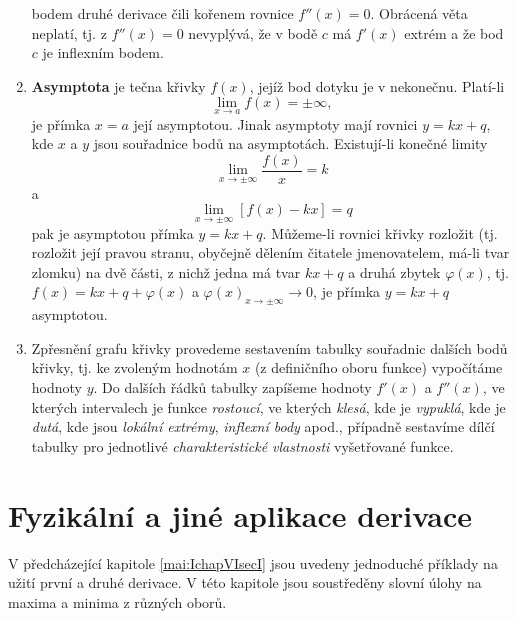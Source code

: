 \begin{enumerate}[noitemsep]
        bodem druhé derivace čili kořenem rovnice $f''(x)=0$. Obrácená věta neplatí, tj. z
        $f''(x)=0$ nevyplývá, že v bodě $c$ má $f'(x)$ extrém a že bod $c$ je inflexním bodem.
      \item \textbf{Asymptota} je tečna křivky $f(x)$, jejíž bod dotyku je v nekonečnu. Platí-li  
        $$\lim_{x \to a}f(x) =  \pm\infty,$$ je přímka $x=a$ její asymptotou. Jinak asymptoty mají
        rovnici $y=kx+q$, kde $x$ a $y$ jsou souřadnice bodů na asymptotách. Existují-li konečné
        limity $$\lim_{x \to \pm\infty}\frac{f(x)}{x}=k$$  a $$\lim_{x \to \pm\infty}[f(x)-kx] =q$$
        pak je asymptotou přímka $y=kx+q$. Můžeme-li rovnici křivky rozložit (tj. rozložit její
        pravou stranu, oby\-čejně dělením čitatele jmenovatelem, má-li tvar zlomku) na dvě části, z
        nichž jedna má tvar $kx+q$ a druhá zbytek $\varphi(x)$, tj. $f(x)=kx+q+\varphi(x)$ a
        $\varphi(x)_{x\rightarrow \pm\infty}\rightarrow 0$, je přímka $y=kx+q$ asymptotou.
      \item Zpřesnění grafu křivky provedeme sestavením tabulky souřadnic dalších bodů křivky, tj.
        ke zvoleným hodnotám $x$ (z definičního oboru funkce) vypočítáme hodnoty $y$. Do dalších
        řádků tabulky zapíšeme hodnoty  $f'(x)$ a $f''(x)$, ve kterých intervalech je funkce
        \emph{rostoucí}, ve kterých \emph{klesá}, kde je \emph{vypuklá}, kde je \emph{dutá}, kde
        jsou \emph{lokální extrémy}, \emph{inflexní body} apod., případně sestavíme dílčí tabulky
        pro jednotlivé \emph{charakteristické vlastnosti} vyšetřované funkce.
    \end{enumerate}
    

\section{Fyzikální a jiné aplikace derivace}\label{mai:IchapVIsecII}
    V předcházející kapitole \ref{mai:IchapVIsecI} jsou uvedeny jednoduché příklady na užití první a
    druhé derivace. V této kapitole jsou soustředěny slovní úlohy na maxima a minima z různých
    oborů.
    

    

    


